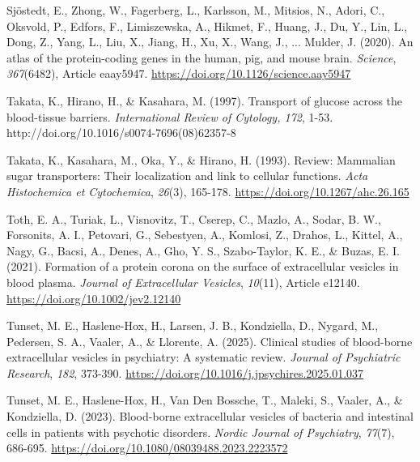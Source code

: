 \documentclass[authordate, empirical]{jote-new-article}
\begin{document}
	Sjöstedt, E., Zhong, W., Fagerberg, L., Karlsson, M., Mitsios, N., Adori, C., Oksvold, P., Edfors, F., Limiszewska, A., Hikmet, F., Huang, J., Du, Y., Lin, L., Dong, Z., Yang, L., Liu, X., Jiang, H., Xu, X., Wang, J., ... Mulder, J. (2020). An atlas of the protein-coding genes in the human, pig, and mouse brain. \emph{Science},\emph{ 367}(6482), Article eaay5947. \href{https://doi.org/10.1126/science.aay5947}{https://doi.org/10.1126/science.aay5947}



	Takata, K., Hirano, H., \& Kasahara, M. (1997). Transport of glucose across the blood-tissue barriers. \emph{International Review of Cytology, 172}, 1-53. http://doi.org/10.1016/s0074-7696(08)62357-8



	Takata, K., Kasahara, M., Oka, Y., \& Hirano, H. (1993). Review: Mammalian sugar transporters: Their localization and link to cellular functions. \emph{Acta Histochemica et Cytochemica},\emph{ 26}(3), 165-178. \href{https://doi.org/10.1267/ahc.26.165}{https://doi.org/10.1267/ahc.26.165}



	Toth, E. A., Turiak, L., Visnovitz, T., Cserep, C., Mazlo, A., Sodar, B. W., Forsonits, A. I., Petovari, G., Sebestyen, A., Komlosi, Z., Drahos, L., Kittel, A., Nagy, G., Bacsi, A., Denes, A., Gho, Y. S., Szabo-Taylor, K. E., \& Buzas, E. I. (2021). Formation of a protein corona on the surface of extracellular vesicles in blood plasma. \emph{Journal of Extracellular Vesicles},\emph{ 10}(11), Article e12140. \href{https://doi.org/10.1002/jev2.12140}{https://doi.org/10.1002/jev2.12140}



	Tunset, M. E., Haslene-Hox, H., Larsen, J. B., Kondziella, D., Nygard, M., Pedersen, S. A., Vaaler, A., \& Llorente, A. (2025). Clinical studies of blood-borne extracellular vesicles in psychiatry: A systematic review. \emph{Journal of Psychiatric Research},\emph{ 182}, 373-390. \href{https://doi.org/10.1016/j.jpsychires.2025.01.037}{https://doi.org/10.1016/j.jpsychires.2025.01.037}



	Tunset, M. E., Haslene-Hox, H., Van Den Bossche, T., Maleki, S., Vaaler, A., \& Kondziella, D. (2023). Blood-borne extracellular vesicles of bacteria and intestinal cells in patients with psychotic disorders. \emph{Nordic Journal of Psychiatry},\emph{ 77}(7), 686-695. \href{https://doi.org/10.1080/08039488.2023.2223572}{https://doi.org/10.1080/08039488.2023.2223572}
\end{document}
